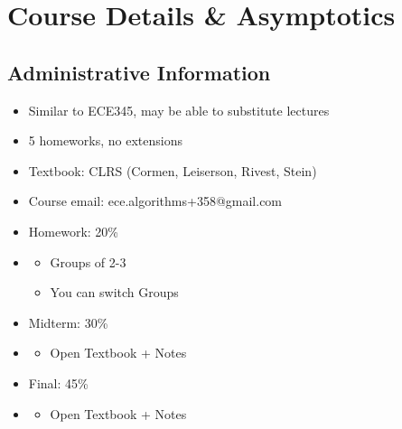 \chapter{Course Details \& Asymptotics}
\section{Administrative Information}

\begin{itemize}
    \item Similar to ECE345, may be able to substitute lectures
    \item 5 homeworks, no extensions
    \item Textbook: CLRS (Cormen, Leiserson, Rivest, Stein)
    \item Course email: ece.algorithms+358@gmail.com
    \item Homework: 20\%
    \item \begin{itemize}
              \item Groups of 2-3
              \item You can switch Groups
          \end{itemize}
    \item Midterm: 30\%
    \item \begin{itemize}
              \item Open Textbook + Notes
          \end{itemize}
    \item Final: 45\%
    \item \begin{itemize}
              \item Open Textbook + Notes
          \end{itemize}
\end{itemize}

